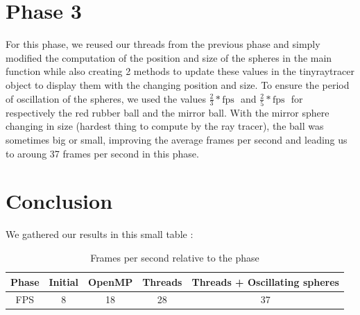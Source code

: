 \documentclass{article}
\begin{document}
\section{Phase 3}
For this phase, we reused our threads from the previous phase and simply modified the computation of the position and size of the spheres in the main function while also creating 2 methods to update these values in the tinyraytracer object to display them 
with the changing position and size. To ensure the period of oscillation of the spheres, we used the values $\frac{2}{3}*\text{fps }$ and $\frac{2}{5}*\text{fps }$ for respectively the red rubber ball and the mirror ball. With the mirror sphere changing in size (hardest thing to compute 
by the ray tracer), the ball was sometimes big or small, improving the average frames per second and leading us to aroung 37 frames per second in this phase.
\section{Conclusion}
We gathered our results in this small table :

\begin{table}[!h]
  \centering
  \begin{tabular}{|c|c|c|c|c|}
  \hline
  Phase & Initial & OpenMP & Threads & Threads + Oscillating spheres \\ \hline
  FPS   & 8       & 18     & 28      & 37                            \\ \hline
  \end{tabular}
  \caption{Frames per second relative to the phase}
  \label{tab:resume}
\end{table}
\end{document}
